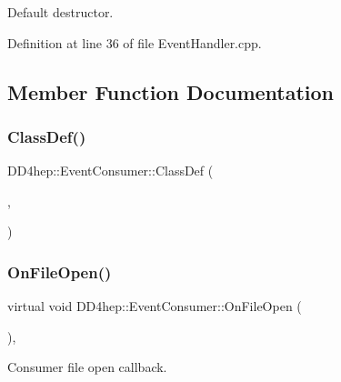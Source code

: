 Default destructor. 



Definition at line 36 of file Event\+Handler.\+cpp.



\subsection{Member Function Documentation}
\hypertarget{class_d_d4hep_1_1_event_consumer_a659e7fffc8eb8674af560b124f2a648d}{}\label{class_d_d4hep_1_1_event_consumer_a659e7fffc8eb8674af560b124f2a648d} 
\subsubsection{\texorpdfstring{Class\+Def()}{ClassDef()}}
{\footnotesize\ttfamily D\+D4hep\+::\+Event\+Consumer\+::\+Class\+Def (\begin{DoxyParamCaption}\item[{\hyperlink{class_d_d4hep_1_1_event_consumer}{Event\+Consumer}}]{,  }\item[{0}]{ }\end{DoxyParamCaption})}

\hypertarget{class_d_d4hep_1_1_event_consumer_a0a1c56dd7a70e28812fb68c9144ef2fa}{}\label{class_d_d4hep_1_1_event_consumer_a0a1c56dd7a70e28812fb68c9144ef2fa} 
\subsubsection{\texorpdfstring{On\+File\+Open()}{OnFileOpen()}}
{\footnotesize\ttfamily virtual void D\+D4hep\+::\+Event\+Consumer\+::\+On\+File\+Open (\begin{DoxyParamCaption}\item[{\hyperlink{class_d_d4hep_1_1_event_handler}{Event\+Handler} $\ast$}]{ }\end{DoxyParamCaption})\hspace{0.3cm}{\ttfamily [inline]}, {\ttfamily [virtual]}}



Consumer file open callback. 



